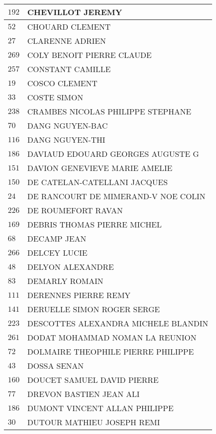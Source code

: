 \begin{xltabular}{\linewidth}{|l|X|}
    \hline
    $192$ & CHEVILLOT JEREMY \\
    \hline
    $52$ & CHOUARD CLEMENT \\
    \hline
    $27$ & CLARENNE ADRIEN \\
    \hline
    $269$ & COLY BENOIT PIERRE CLAUDE \\
    \hline
    $257$ & CONSTANT CAMILLE \\
    \hline
    $19$ & COSCO CLEMENT \\
    \hline
    $33$ & COSTE SIMON \\
    \hline
    $238$ & CRAMBES NICOLAS PHILIPPE STEPHANE \\
    \hline
    $70$ & DANG NGUYEN-BAC \\
    \hline
    $116$ & DANG NGUYEN-THI \\
    \hline
    $186$ & DAVIAUD EDOUARD GEORGES AUGUSTE G \\
    \hline
    $151$ & DAVION GENEVIEVE MARIE AMELIE \\
    \hline
    $150$ & DE CATELAN-CATELLANI JACQUES \\
    \hline
    $24$ & DE RANCOURT DE MIMERAND-V NOE COLIN \\
    \hline
    $226$ & DE ROUMEFORT RAVAN \\
    \hline
    $169$ & DEBRIS THOMAS PIERRE MICHEL \\
    \hline
    $68$ & DECAMP JEAN \\
    \hline
    $266$ & DELCEY LUCIE \\
    \hline
    $48$ & DELYON ALEXANDRE \\
    \hline
    $83$ & DEMARLY ROMAIN \\
    \hline
    $111$ & DERENNES PIERRE REMY \\
    \hline
    $141$ & DERUELLE SIMON ROGER SERGE \\
    \hline
    $223$ & DESCOTTES ALEXANDRA MICHELE BLANDIN \\
    \hline
    $261$ & DODAT MOHAMMAD NOMAN LA REUNION \\
    \hline
    $72$ & DOLMAIRE THEOPHILE PIERRE PHILIPPE \\
    \hline
    $43$ & DOSSA SENAN \\
    \hline
    $160$ & DOUCET SAMUEL DAVID PIERRE \\
    \hline
    $77$ & DREVON BASTIEN JEAN ALI \\
    \hline
    $186$ & DUMONT VINCENT ALLAN PHILIPPE \\
    \hline
    $30$ & DUTOUR MATHIEU JOSEPH REMI \\

\end{xltabular}
